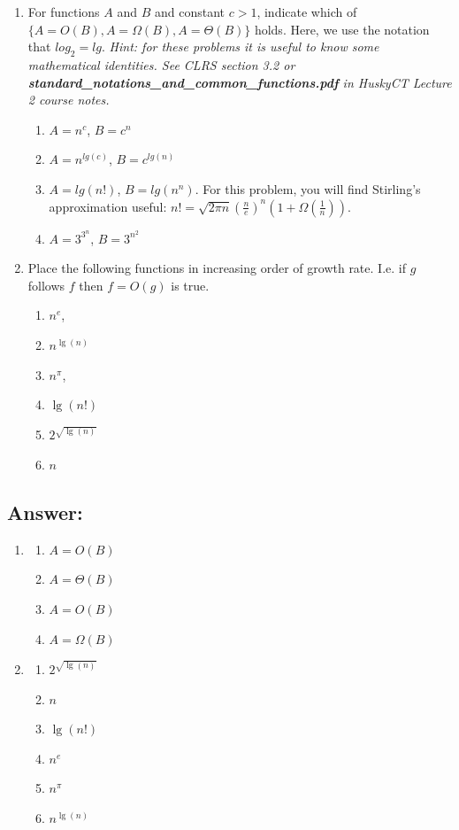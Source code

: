 \documentclass[12pt,letterpaper]{article}
\begin{document}
\begin{enumerate}
    \item For functions $A$ and $B$ and constant $c>1$, indicate which of $\{A = O(B),A = \Omega(B),A = \Theta(B)\}$ holds. Here, we use the notation that $log_2=lg$. \textit{Hint: for these problems it is useful to know some mathematical identities. See CLRS section 3.2 or \textbf{standard\_notations\_and\_common\_functions.pdf} in HuskyCT Lecture 2 course notes.} 
    \begin{enumerate}
        \item $A=n^c$, $B=c^n$
        \item $A=n^{lg(c)}$, $B=c^{lg(n)}$
        \item $A=lg(n!)$, $B=lg(n^n)$. For this problem, you will find Stirling's approximation useful: $n!=\sqrt{2 \pi n}\left( \frac{n}{e} \right)^n \left( 1 + \Omega \left( \frac{1}{n} \right) \right)$.
        \item $A=3^{3^n}$, $B=3^{n^2}$
    \end{enumerate}
    \item Place the following functions in increasing order of growth rate. I.e. if $g$ follows $f$ then $f=O(g)$ is true.
    \begin{enumerate}
        \item $n^e$, 
        \item $n^{\lg(n)}$
        \item $n^\pi$, 
        \item $\lg(n!)$
        \item $2^{\sqrt{\lg(n)}}$
        \item $n$
    \end{enumerate}
\end{enumerate}

\subsection*{Answer:}
\begin{enumerate}
    \item \begin{enumerate}
        \item $A = O(B)$
        \item $A = \Theta(B)$
        \item $A = O(B)$
        \item $A = \Omega(B)$
    \end{enumerate}
    \item \begin{enumerate}
        \item $2^{\sqrt{\lg(n)}}$
        \item $n$
        \item $\lg(n!)$
        \item $n^e$
        \item $n^\pi$
        \item $n^{\lg(n)}$
    \end{enumerate}

\end{enumerate}
\end{document}
